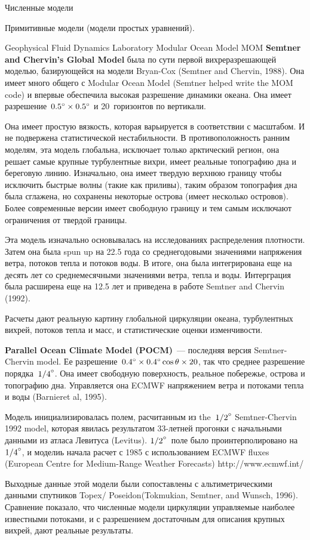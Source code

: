 \begin{chapter}{Численные модели}
\begin{section}{Примитивные модели (модели простых уравнений).}
\begin{paragraph}{Geophysical Fluid Dynamics Laboratory Modular Ocean Model MOM}
\textbf{Semtner and Chervin's Global Model} была по сути первой
вихреразрешающей моделью, базирующейся на модели Bryan-Cox (Semtner
and Chervin, 1988). Она имеет много общего с Modular Ocean Model
(Semtner helped write the MOM code) и впервые обеспечила высокая
разрешение динамики океана. Она имеет 
разрешение~${0.5}^\circ\times{0.5}^\circ$ и 20~горизонтов по вертикали.

Она имеет простую вязкость, которая варьируется в соответствии с
масштабом. И не подвержена статистической нестабильности. В
противоположность ранним моделям, эта модель глобальна, исключает
только арктический регион, она решает самые крупные турбулентные
вихри, имеет реальные топографию дна и береговую линию. Изначально,
она имеет твердую верхнюю границу чтобы исключить быстрые волны (такие
как приливы), таким образом топография дна была сглажена, но сохранены
некоторые острова (имеет несколько островов). Более современные версии
имеет свободную границу и тем самым исключают ограничения от твердой
границы.

Эта модель изначально основывалась на исследованиях распределения
плотности. Затем она была spun up на 22.5 года со среднегодовыми
значениями напряжения ветра, потоков тепла и потоков воды. В итоге,
она была интегрирована еще на десять лет со среднемесячными значениями
ветра, тепла и воды. Интерграция была расширена еще на 12.5 лет и
приведена в работе Semtner and Chervin (1992).

Расчеты дают реальную картину глобальной циркуляции океана,
турбулентных вихрей, потоков тепла и масс, и статистические оценки
изменчивости.

\textbf{Parallel Ocean Climate Model (POCM)}~--- последняя версия
Semtner-Chervin model. Ее 
разрешение~${0.4}^\circ\times{0.4}^\circ\cos\theta \times 20$, так что
среднее разрешение порядка~${1/4}^\circ$. Она имеет свободную поверхность,
реальное побережье, острова и топографию дна. Управляется она ECMWF
напряжением ветра и потоками тепла и воды (Barnieret al, 1995).

Модель инициализировалась полем, расчитанным из the~${1/2}^\circ$
Semtner-Chervin 1992 model, которая явилась результатом 33-летней
прогонки с начальными данными из атласа Левитуса (Levitus). ${1/2}^\circ$~поле
было проинтерполировано на~${1/4}^\circ$, и моделиь начала расчет с 1985 с
использованием ECMWF fluxes (European Centre for Medium-Range Weather
Forecasts) http://www.ecmwf.int/

Выходные данные этой модели были сопоставлены с альтиметрическими
данными спутников Topex/ Poseidon(Tokmukian, Semtner, and Wunsch,
1996). Сравнение показало, что численные модели циркуляции управляемые
наиболее известными потоками, и с разрешением достаточным для описания
крупных вихрей, дают реальные результаты.


\end{paragraph}
\end{section}
\end{chapter}
